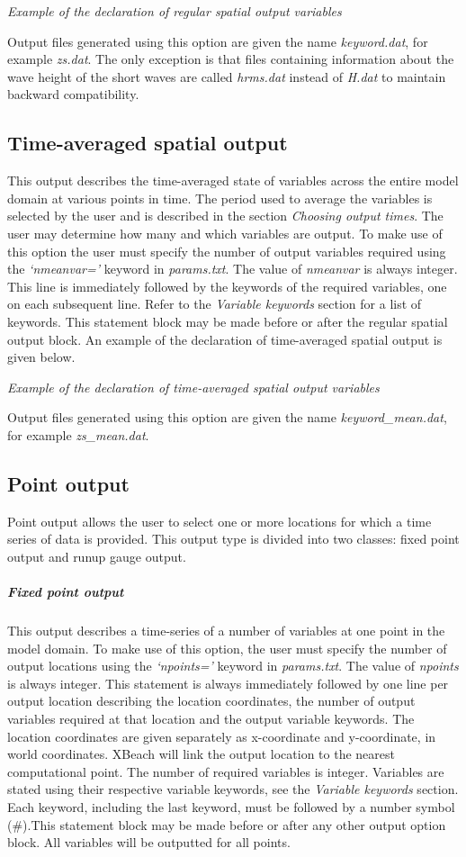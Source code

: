 \textit{Example of the declaration of regular spatial output variables}

Output files generated using this option are given the name \textit{keyword.dat}, for example \textit{zs.dat}. The only exception is that files containing information about the wave height of the short waves are called \textit{hrms.dat} instead of \textit{H.dat} to maintain backward compatibility.
\subsection{ Time-averaged spatial output}

This output describes the time-averaged state of variables across the entire model domain at various points in time. The period used to average the variables is selected by the user and is described in the section \textit{Choosing output times}. The user may determine how many and which variables are output. To make use of this option the user must specify the number of output variables required using the \textit{`nmeanvar='} keyword in \textit{params.txt}. The value of \textit{nmeanvar} is always integer. This line is immediately followed by the keywords of the required variables, one on each subsequent line. Refer to the \textit{Variable keywords} section for a list of keywords. This statement block may be made before or after the regular spatial output block. An example of the declaration of time-averaged spatial output is given below.

\textit{Example of the declaration of time-averaged spatial output variables}

Output files generated using this option are given the name \textit{keyword\_mean.dat}, for example \textit{zs\_mean.dat}. 
\subsection{ Point output}

Point output allows the user to select one or more locations for which a time series of data is provided. This output type is divided into two classes: fixed point output and runup gauge output.
\subparagraph{ Fixed point output}

This output describes a time-series of a number of variables at one point in the model domain. To make use of this option, the user must specify the number of output locations using the \textit{`npoints='} keyword in \textit{params.txt}. The value of \textit{npoints} is always integer. This statement is always immediately followed by one line per output location describing the location coordinates, the number of output variables required at that location and the output variable keywords. The location coordinates are given separately as x-coordinate and y-coordinate, in world coordinates. XBeach will link the output location to the nearest computational point. The number of required variables is integer. Variables are stated using their respective variable keywords, see the \textit{Variable keywords} section. Each keyword, including the last keyword, must be followed by a number symbol (\#).This statement block may be made before or after any other output option block. All variables will be outputted for all points. 

